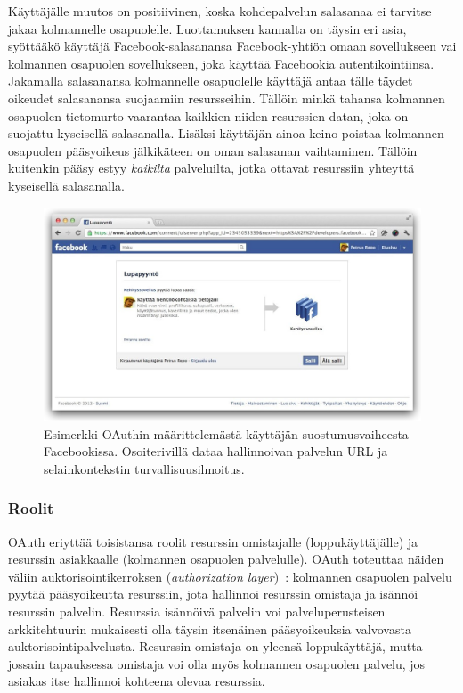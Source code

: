 \documentclass[finnish,gradu]{tktltiki}
\begin{document}
  Käyttäjälle muutos on positiivinen, koska kohdepalvelun salasanaa ei tarvitse jakaa kolmannelle osapuolelle. Luottamuksen kannalta on täysin eri asia, syöttääkö käyttäjä Facebook-salasanansa Facebook-yhtiön omaan sovellukseen vai kolmannen osapuolen sovellukseen, joka käyttää Facebookia autentikointiinsa. Jakamalla salasanansa kolmannelle osapuolelle käyttäjä antaa tälle täydet oikeudet salasanansa suojaamiin resursseihin. Tällöin minkä tahansa kolmannen osapuolen tietomurto vaarantaa kaikkien niiden resurssien datan, joka on suojattu kyseisellä salasanalla. Lisäksi käyttäjän ainoa keino poistaa kolmannen osapuolen pääsyoikeus jälkikäteen on oman salasanan vaihtaminen. Tällöin kuitenkin pääsy estyy \emph{kaikilta} palveluilta, jotka ottavat resurssiin yhteyttä kyseisellä salasanalla.

  \begin{figure}
    \centering
    \includegraphics[width=1.0\textwidth]{images/facebook_oauth_lupapyynto.jpg}
    \caption[OAuth-käyttäjäsuostumusvaihe Facebookissa.]{Esimerkki OAuthin määrittelemästä käyttäjän suostumusvaiheesta Facebookissa. Osoiterivillä dataa hallinnoivan palvelun URL ja selainkontekstin turvallisuusilmoitus.}
    \label{fig:facebook_oauth_lupapyynto}
  \end{figure}


  \subsubsection{Roolit} %
  \label{ssub:roolit}

  OAuth eriyttää toisistansa roolit resurssin omistajalle (loppukäyttäjälle) ja resurssin asiakkaalle (kolmannen osapuolen palvelulle). OAuth toteuttaa näiden väliin auktorisointikerroksen (\emph{authorization layer})~\cite{ietf_oauth2}: kolmannen osapuolen palvelu pyytää pääsyoikeutta resurssiin, jota hallinnoi resurssin omistaja ja isännöi resurssin palvelin. Resurssia isännöivä palvelin voi palveluperusteisen arkkitehtuurin mukaisesti olla täysin itsenäinen pääsyoikeuksia valvovasta auktorisointipalvelusta. Resurssin omistaja on yleensä loppukäyttäjä, mutta jossain tapauksessa omistaja voi olla myös kolmannen osapuolen palvelu, jos asiakas itse hallinnoi kohteena olevaa resurssia.
\end{document}
